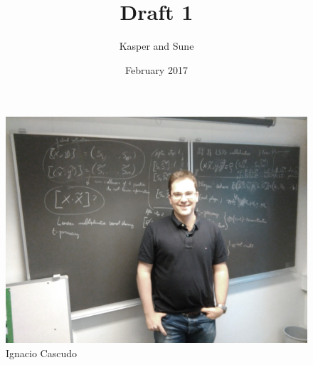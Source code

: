 \documentclass[a4paper]{article}
\title{Draft 1}
\author{Kasper and  Sune}
\date{February 2017}
\theoremstyle{plain}
\begin{document}
\maketitle

\begin{figure}[h]
    \centering
    \includegraphics[scale=0.1]{Ignacio.jpg}
    \caption{Ignacio Cascudo}
\end{figure}











\clearpage












\clearpage


\clearpage






\clearpage

\end{document}

